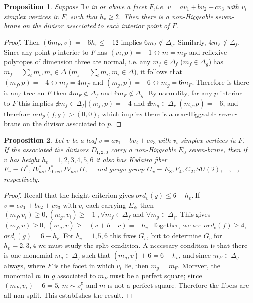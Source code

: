 \documentclass[aps,prl,twocolumn, superscriptaddress,groupedaddress,nofootinbib]{revtex4}
\newtheorem{prop}{Proposition}
\begin{document}
\begin{prop}
\label{prop:NH7fromsingletree}
Suppose $\exists \, v $ in or above a facet $F$,i.e. $v=av_1+bv_2+cv_3$ with $v_i$ simplex vertices in $F$, such that $h_v\geq 2$. Then there is a non-Higgsable seven-brane on the divisor associated
to each interior point of $F$.
\end{prop}

\begin{proof}
Then $(6 m_F,v)=-6h_v \leq -12$ implies $6m_F \notin \Delta_g$.
Similarly, $4m_F \notin \Delta_f$. Since any point $p$ interior to $F$ has 
$(m,p)=-1 \leftrightarrow m=m_F$ and reflexive polytopes of dimension three
are normal, i.e. any $m_f\in \Delta_f$ ($m_f \in \Delta_g$) has
$m_f = \sum_i m_i, m_i\in \Delta$ ($m_g = \sum_i m_i, m_i\in \Delta$),
it follows that $(m_f,p)=-4 \leftrightarrow m_f = 4m_F$ and $(m_g,p)=-6 \leftrightarrow m_g = 6m_F$. Therefore is there is any tree on $F$
then $4m_F \notin \Delta_f$ and $6m_F\notin \Delta_g$. By normality,
for any $p$ interior to $F$ this implies
$\nexists m_f \in \Delta_f | (m_f,p)=-4$ and
$\nexists m_g \in \Delta_g | (m_g,p)=-6$, and therefore $ord_p(f,g) > (0,0)$,
which implies there is a non-Higgsable seven-brane on the divisor associated to $p$.
\end{proof}

\begin{prop}
\label{prop:E8roots}
Let $v$ be a leaf $v=av_1 + bv_2 + cv_3$ with $v_i$ simplex vertices in $F$. If
the associated the divisors $D_{1,2,3}$
carry a non-Higgsable $E_8$ seven-brane, then if $v$ has height
 $h_v=1,2,3,4,5,6$ it also has Kodaira fiber $F_v=II^*,IV^*_{ns},I^*_{0,ns},IV_{ns},II,-$
and gauge group $G_v=E_8,F_4,G_2,SU(2),-,-$, respectively.
\end{prop}
\begin{proof}
Recall that the height criterion
gives $ord_v(g)\leq 6-h_v$. If $v=av_1+bv_2+cv_3$ with $v_i$ each carrying $E_8$,
then 
$(m_f,v_i)\geq 0, (m_g,v_i)\geq -1\,\,, \forall m_f\in \Delta_f 
$ and $\forall m_g\in \Delta_g$.
This gives $(m_f,v)\geq 0$, $(m_g,v)\geq-(a+b+c)= -h_v$. Together, we see
$ord_v(f)\geq 4$, $ord_v(g)=6-h_v$. For $h_v= 1,5,6$ this fixes $G_v$, but 
to determine $G_v$ for $h_v=2,3,4$ we must study the split condition. A necessary
condition is that there is one monomial $m_g\in \Delta_g$ such that $(m_g,v)+6=6-h_v$,
and since $m_F \in \Delta_g$ always, where $F$ is the facet in which $v_i$ lie,
then $m_g=m_F$. Morever, the monomial $m$ in $g$ associated to $m_F$ must be a perfect
square; since $(m_F,v_i)+6=5$, $m\sim x_i^5$ and $m$ is not a perfect square. 
Therefore the fibers are all non-split. This establishes the result.
\end{proof}
\end{document}
